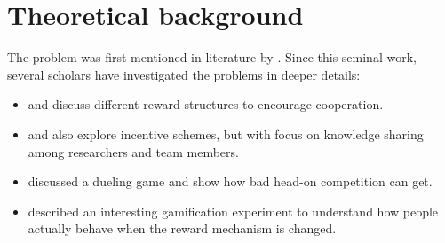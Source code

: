 \documentclass[11pt, a4paper]{article}
\begin{document}
	\section{Theoretical background}
	The problem was first mentioned in literature by \cite{Drago1991}. Since this seminal work, several scholars have investigated the problems in deeper details:
	\begin{itemize}
		\item \cite{Drago1998} and \cite{Kistruck2016} discuss different reward structures to encourage cooperation.
		\item \cite{Banerjee2014} and \cite{Chakravarti2015} also explore incentive schemes, but with focus on knowledge sharing among researchers and team members.
		\item \cite{Immorlica2011} discussed a dueling game and show how bad head-on competition can get.
		\item \cite{Landers2015} described an interesting gamification experiment to understand how people actually behave when the reward mechanism is changed.		
	\end{itemize}
	
	
	
\end{document}
